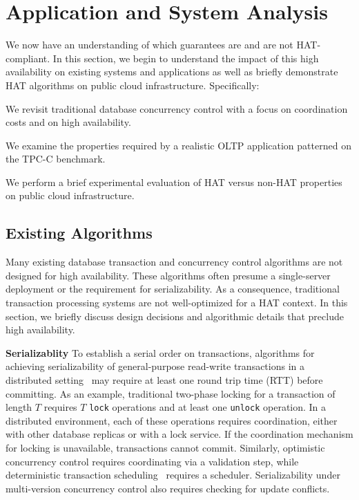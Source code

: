 
\section{Application and System Analysis}
\label{sec:evaluation}

We now have an understanding of which guarantees are and are not
HAT-compliant. In this section, we begin to understand the impact of
this high availability on existing systems and applications as well as
briefly demonstrate HAT algorithms on public cloud
infrastructure. Specifically:

\begin{myenumerate}
\item We revisit traditional database concurrency control with a focus
  on coordination costs and on high availability.
\item We examine the properties required by a realistic OLTP
  application patterned on the TPC-C benchmark.
\item We perform a brief experimental evaluation of HAT versus non-HAT
  properties on public cloud infrastructure.
\end{myenumerate}

\subsection{Existing Algorithms}

Many existing database transaction and concurrency control algorithms
are not designed for high availability. These algorithms often presume
a single-server deployment or the requirement for serializability. As
a consequence, traditional transaction processing systems are not
well-optimized for a HAT context. In this section, we briefly discuss
design decisions and algorithmic details that preclude high
availability.

\vspace{.5em}\noindent\textbf{Serializablity} To establish a serial
order on transactions, algorithms for achieving serializability of
general-purpose read-write transactions in a distributed
setting~\cite{bernstein-book} may require at least one round trip time
(RTT) before committing. As an example, traditional two-phase locking
for a transaction of length $T$ requires $T$ \texttt{lock} operations
and at least one \texttt{unlock} operation.  In a distributed
environment, each of these operations requires coordination, either
with other database replicas or with a lock service. If the
coordination mechanism for locking is unavailable, transactions cannot
commit. Similarly, optimistic concurrency control requires
coordinating via a validation step, while deterministic transaction
scheduling~\cite{deterministic-scheduling} requires a
scheduler. Serializability under multi-version concurrency control
also requires checking for update conflicts.

